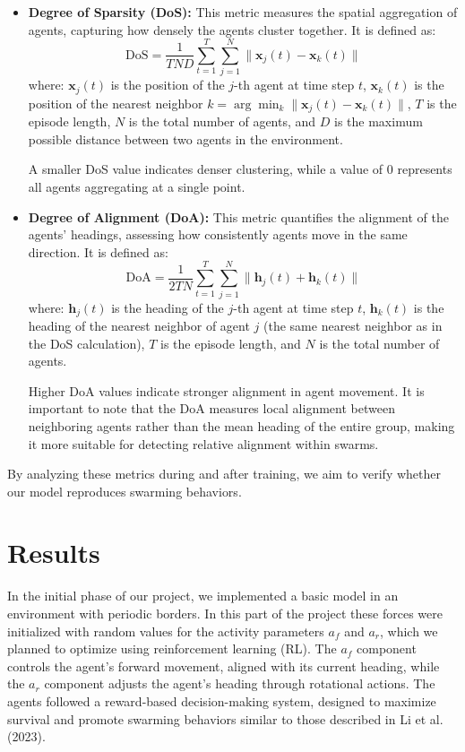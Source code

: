 \documentclass[9pt]{pnas-new}
\begin{document}
\begin{itemize}
    \item \textbf{Degree of Sparsity (DoS):} This metric measures the spatial aggregation of agents, capturing how densely the agents cluster together. It is defined as:
    \[
    \text{DoS} = \frac{1}{TND} \sum_{t=1}^T \sum_{j=1}^N \| \mathbf{x}_j(t) - \mathbf{x}_k(t) \|
    \]
    where: \( \mathbf{x}_j(t) \) is the position of the \(j\)-th agent at time step \(t\), \( \mathbf{x}_k(t) \) is the position of the nearest neighbor \(k = \arg\min_k \| \mathbf{x}_j(t) - \mathbf{x}_k(t) \| \), \(T\) is the episode length, \(N\) is the total number of agents, and \(D\) is the maximum possible distance between two agents in the environment.
    
    A smaller DoS value indicates denser clustering, while a value of 0 represents all agents aggregating at a single point.

    \item \textbf{Degree of Alignment (DoA):} This metric quantifies the alignment of the agents' headings, assessing how consistently agents move in the same direction. It is defined as:
    \[
    \text{DoA} = \frac{1}{2TN} \sum_{t=1}^T \sum_{j=1}^N \| \mathbf{h}_j(t) + \mathbf{h}_k(t) \|
    \]
    where: \( \mathbf{h}_j(t) \) is the heading of the \(j\)-th agent at time step \(t\), \( \mathbf{h}_k(t) \) is the heading of the nearest neighbor of agent \(j\) (the same nearest neighbor as in the DoS calculation), \(T\) is the episode length, and \(N\) is the total number of agents.
    
    Higher DoA values indicate stronger alignment in agent movement. It is important to note that the DoA measures local alignment between neighboring agents rather than the mean heading of the entire group, making it more suitable for detecting relative alignment within swarms.
\end{itemize}

By analyzing these metrics during and after training, we aim to verify whether our model reproduces swarming behaviors.


\section*{Results}

In the initial phase of our project, we implemented a basic model in an environment with periodic borders. 
In this part of the project these forces were initialized with random values for the activity parameters $a_f$ and $a_r$, which we planned to optimize using reinforcement learning (RL). 
The $a_f$ component controls the agent's forward movement, aligned with its current heading, while the $a_r$ component adjusts the agent's heading through rotational actions.
The agents followed a reward-based decision-making system, designed to maximize survival and promote swarming behaviors similar to those described in Li et al. (2023).
\end{document}
